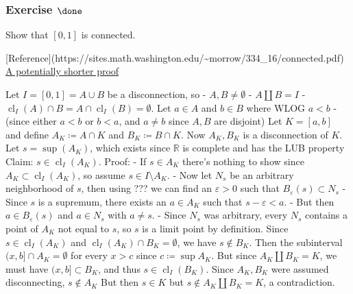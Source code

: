 \hypertarget{exercise-done-1}{%
\subsubsection{\texorpdfstring{Exercise
\(\done\)}{Exercise \textbackslash done}}\label{exercise-done-1}}

Show that \([0, 1]\) is connected.

\begin{solution}

\hfill

\begin{concept}

\hfill [Reference](https://sites.math.washington.edu/\textasciitilde morrow/334\_16/connected.pdf)
\href{https://math.stackexchange.com/questions/934421/proof-of-that-every-interval-is-connected}{A
potentially shorter proof}

\end{concept}

Let \(I = [0, 1] = A\cup B\) be a disconnection, so -
\(A, B \neq \emptyset\) - \(A {\coprod}B = I\) -
\({ \operatorname{cl}} _I(A) \cap B = A \cap{ \operatorname{cl}} _I(B) = \emptyset\).
Let \(a\in A\) and \(b\in B\) where WLOG \(a<b\) - (since either \(a<b\)
or \(b<a\), and \(a\neq b\) since \(A, B\) are disjoint) Let
\(K = [a, b]\) and define \(A_K \coloneqq A\cap K\) and
\(B_K \coloneqq B\cap K\). Now \(A_K, B_K\) is a disconnection of \(K\).
Let \(s = \sup(A_K)\), which exists since \({\mathbb{R}}\) is complete
and has the LUB property Claim: \(s \in { \operatorname{cl}} _I(A_K)\).
Proof: - If \(s\in A_K\) there's nothing to show since
\(A_K \subset { \operatorname{cl}} _I(A_K)\), so assume
\(s\in I\setminus A_K\). - Now let \(N_s\) be an arbitrary neighborhood
of \(s\), then using ??? we can find an \(\varepsilon>0\) such that
\(B_\varepsilon(s) \subset N_s\) - Since \(s\) is a supremum, there
exists an \(a\in A_K\) such that \(s-\varepsilon< a\). - But then
\(a \in B_\varepsilon(s)\) and \(a\in N_s\) with \(a\neq s\). - Since
\(N_s\) was arbitrary, every \(N_s\) contains a point of \(A_K\) not
equal to \(s\), so \(s\) is a limit point by definition. Since
\(s\in { \operatorname{cl}} _I(A_K)\) and
\({ \operatorname{cl}} _I(A_K)\cap B_K = \emptyset\), we have
\(s\not \in B_K\). Then the subinterval \((x, b] \cap A_K = \emptyset\)
for every \(x>c\) since \(c \coloneqq\sup A_K\). But since
\(A_K {\coprod}B_K = K\), we must have \((x, b] \subset B_K\), and thus
\(s\in { \operatorname{cl}} _I(B_K)\). Since \(A_K, B_K\) were assumed
disconnecting, \(s\not \in A_K\) But then \(s\in K\) but
\(s\not\in A_K {\coprod}B_K = K\), a contradiction.

\end{solution}

